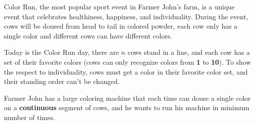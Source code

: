 Color Run, the most popular sport event in Farmer John's farm,
is a unique event that celebrates healthiness, happiness, and individuality.
During the event, cows will be doused from head to tail in colored powder,
each cow only has a single color and different cows can have different colors.

Today is the Color Run day, there are $n$ cows stand in a line,
and each cow has a set of their favorite colors (cows can only recognize colors from \textbf{1} to \textbf{10}).
To show the respect to individuality, cows must get a color in their favorite color set,
and their standing order can't be changed.

Farmer John has a large coloring machine that each time can douse a single color on a \textbf{continuous} segment of cows,
and he wants to run his machine in minimum number of times.
